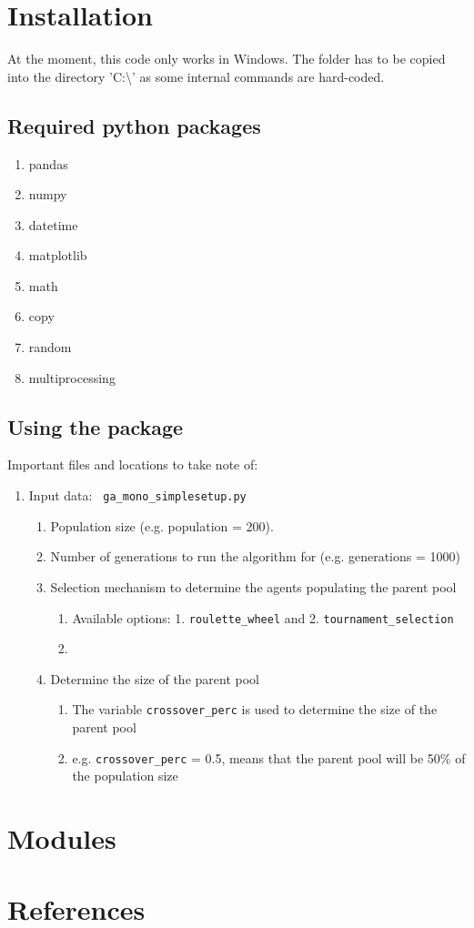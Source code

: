 \documentclass[a4paper]{article}
\begin{document}
\section{Installation}

At the moment, this code only works in Windows\textregistered. The folder has to be copied into the directory 'C:\textbackslash'  as some internal commands are hard-coded.

\subsection{Required python packages}

\begin{enumerate}
\item pandas 
\item numpy 
\item datetime 
\item matplotlib
\item math 
\item copy
\item random
\item multiprocessing 
\end{enumerate}

\subsection{Using the package}
Important files and locations to take note of:

\begin{enumerate}
\item Input data: \texttt{ ga\_mono\_simple\-setup.py}
\begin{enumerate}
\item Population size (e.g. population = 200).
\item Number of generations to run the algorithm for (e.g. generations = 1000)
\item Selection mechanism to determine the agents populating the parent pool
\begin{enumerate}
\item Available options: 1. \texttt{roulette\_wheel} and 2. \texttt{tournament\_selection}
\item 
\end{enumerate}
\item Determine the size of the parent pool 
\begin{enumerate}
\item The variable  \texttt{crossover\_perc} is used to determine the size of the parent pool
\item e.g. \texttt{crossover\_perc} = 0.5, means that the parent pool will be 50\% of the population size
\end{enumerate}
\end{enumerate}
\end{enumerate}





\section{Modules}
\section{References}
\end{document}
